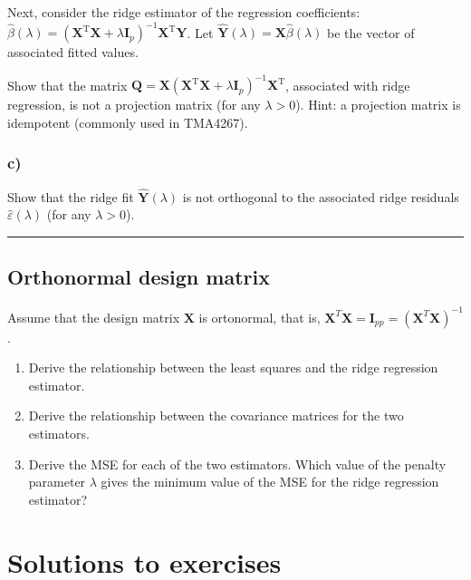 \documentclass[
  letterpaper,
  DIV=11,
  numbers=noendperiod]{scrartcl}
\begin{document}
Next, consider the ridge estimator of the regression coefficients:
\(\hat{\beta}(\lambda) = (\mathbf{X}^\mathrm{T} \mathbf{X} + \lambda \mathbf{I}_{p})^{-1} \mathbf{X}^\mathrm{T} \mathbf{Y}\).
Let \(\hat{\mathbf{Y}}(\lambda) = \mathbf{X} \hat{\beta}(\lambda)\) be
the vector of associated fitted values.

Show that the matrix
\(\mathbf{Q} = \mathbf{X} (\mathbf{X}^\mathrm{T} \mathbf{X} + \lambda \mathbf{I}_{p})^{-1} \mathbf{X}^{\mathrm{T}}\),
associated with ridge regression, is not a projection matrix (for any
\(\lambda > 0\)). Hint: a projection matrix is idempotent (commonly used
in TMA4267).

\hypertarget{c}{%
\subsubsection{c)}\label{c}}

Show that the ridge fit \(\hat{\mathbf{Y}}(\lambda)\) is not orthogonal
to the associated ridge residuals \(\hat{\varepsilon}(\lambda)\) (for
any \(\lambda > 0\)).

\begin{center}\rule{0.5\linewidth}{0.5pt}\end{center}

\hypertarget{orthonormal-design-matrix}{%
\subsection{Orthonormal design matrix}\label{orthonormal-design-matrix}}

Assume that the design matrix \(\mathbf{X}\) is ortonormal, that is,
\(\mathbf{X}^T\mathbf{X}=\mathbf{I}_{pp}=(\mathbf{X}^T\mathbf{X})^{-1}\).

\begin{enumerate}
\def\labelenumi{\alph{enumi})}
\item
  Derive the relationship between the least squares and the ridge
  regression estimator.
\item
  Derive the relationship between the covariance matrices for the two
  estimators.
\item
  Derive the MSE for each of the two estimators. Which value of the
  penalty parameter \(\lambda\) gives the minimum value of the MSE for
  the ridge regression estimator?
\end{enumerate}

\hypertarget{solutions-to-exercises}{%
\section{Solutions to exercises}\label{solutions-to-exercises}}
\end{document}
